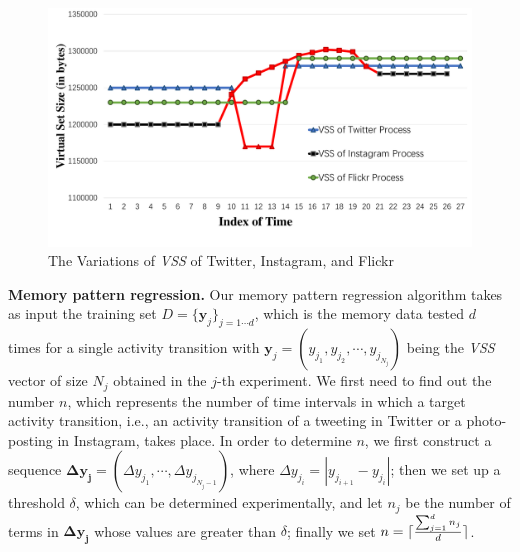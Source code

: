 \documentclass[letterpaper,12pt]{article}
\DeclarePairedDelimiter{\ceil}{\lceil}{\rceil}
\begin{document}
\begin{figure}[!htb]
  \includegraphics[width=\textwidth]{activity-memory.pdf}
  \caption{The Variations of \emph{VSS} of Twitter, Instagram, and Flickr}
  \label{fig:memory-activity}
\end{figure}


{\noindent \bf Memory pattern regression.}
Our memory pattern regression algorithm takes as input the training set $D=\{\mathbf{y}_j\}_{j=1\cdots d}$, which is the memory data tested $d$ times for a single activity transition with $\mathbf{y}_j = (y_{j_1}, y_{j_2}, \cdots, y_{j_{N_j}})$ being the \emph{VSS} vector of size $N_j$ obtained in the $j$-th experiment. We first need to find out the number $n$, which represents the number of time intervals in which a target activity transition, i.e., an activity transition of a tweeting in Twitter or a photo-posting in Instagram, takes place. In order to determine $n$, we first construct a sequence $\mathbf{\Delta y_j} = (\Delta y_{j_1},\cdots,\Delta y_{j_{N_j-1}})$, where $\Delta y_{j_i}=|y_{j_{i+1}}-y_{j_i}|$; %
then we set up a threshold $\delta$, which can be determined experimentally, and let $n_j$ be the number of terms in $\mathbf{\Delta y_j}$ whose values are greater than $\delta$; finally %
we set $n=\ceil{\frac{\sum_{j=1}^{d} n_j}{d}}$.
\end{document}
